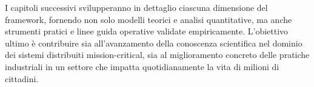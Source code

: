 I capitoli successivi svilupperanno in dettaglio ciascuna dimensione del framework, fornendo non solo modelli teorici e analisi quantitative, ma anche strumenti pratici e linee guida operative validate empiricamente. L'obiettivo ultimo è contribuire sia all'avanzamento della conoscenza scientifica nel dominio dei sistemi distribuiti mission-critical, sia al miglioramento concreto delle pratiche industriali in un settore che impatta quotidianamente la vita di milioni di cittadini.

\clearpage
\printbibliography[
    heading=subbibliography,
    title={Riferimenti Bibliografici del Capitolo 1},
]

\endrefsection
